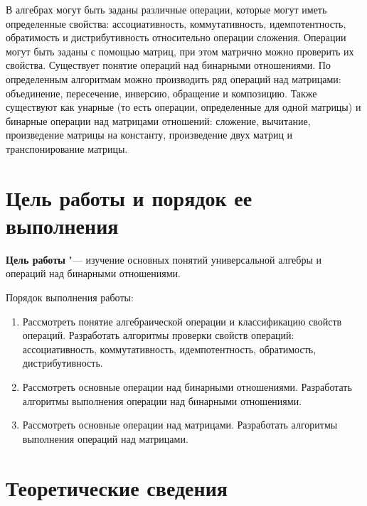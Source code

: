 \documentclass[bachelor, och, labwork]{shiza}
\begin{document}



\tableofcontents

\intro

В алгебрах могут быть заданы различные операции, которые могут иметь определенные
свойства: ассоциативность, коммутативность, идемпотентность, обратимость и
дистрибутивность относительно операции сложения.
Операции могут быть заданы с помощью матриц, при этом матрично можно проверить их
свойства. Существует понятие операций над бинарными отношениями. По определенным
алгоритмам можно производить ряд операций над матрицами: объединение, пересечение, 
инверсию, обращение и композицию. Также существуют как унарные (то есть операции, 
определенные для одной матрицы) и бинарные операции над матрицами отношений: сложение,
вычитание, произведение матрицы на константу, произведение двух матриц и транспонирование
матрицы.

\section{\textbf{Цель работы и порядок ее выполнения}}

\textbf{Цель работы} "--- изучение основных понятий универсальной алгебры и операций 
над бинарными отношениями.

Порядок выполнения работы:

\begin{enumerate}
    \item Рассмотреть понятие алгебраической операции и классификацию свойств операций. 
    Разработать алгоритмы проверки свойств операций: ассоциативность, коммутативность, 
    идемпотентность, обратимость, дистрибутивность.   

    \item Рассмотреть основные операции над бинарными отношениями. Разработать 
    алгоритмы выполнения операции над бинарными отношениями.  

    \item Рассмотреть основные операции над матрицами. Разработать алгоритмы 
    выполнения операций над матрицами.  
\end{enumerate}

\section{Теоретические сведения}
\end{document}
